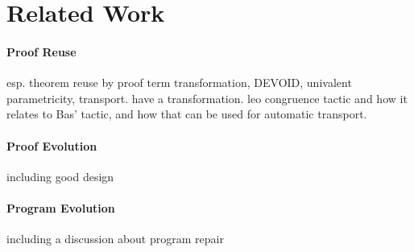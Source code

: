 \section{Related Work}

\paragraph{Proof Reuse}

esp. theorem reuse by proof term transformation, DEVOID, univalent parametricity, transport. \cite{magaud2000changing} have a transformation.
leo congruence tactic and how it relates to Bas' tactic, and how that can be used for automatic transport.

\paragraph{Proof Evolution}

including good design

\paragraph{Program Evolution}

including a discussion about program repair

